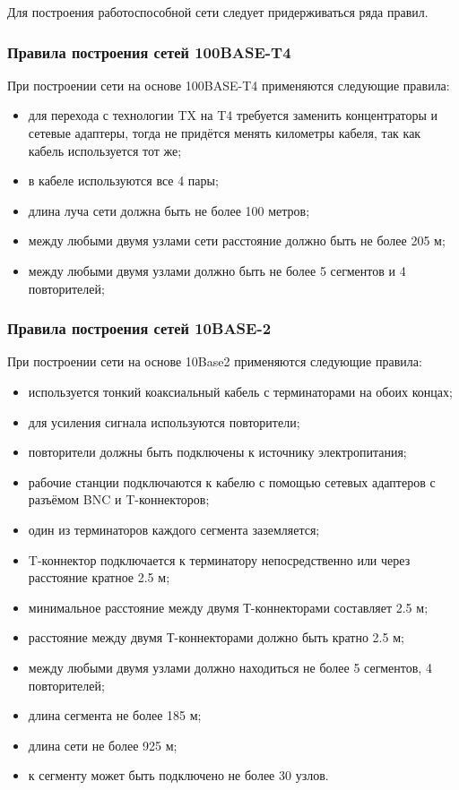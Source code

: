 Для построения работоспособной сети следует придерживаться ряда правил.

\subsubsection{Правила построения сетей 100BASE-T4}

При построении сети на основе 100BASE-T4 применяются следующие правила:
\begin{itemize}
\item для перехода с технологии TX на T4 требуется заменить концентраторы и сетевые адаптеры, тогда не придётся менять километры кабеля, так как кабель используется тот же;
\item в кабеле используются все 4 пары;
\item длина луча сети должна быть не более 100 метров;
\item между любыми двумя узлами сети расстояние должно быть не более 205 м;
\item между любыми двумя узлами должно быть не более 5 сегментов и 4 повторителей;
\end{itemize}

\subsubsection{Правила построения сетей 10BASE-2}

При построении сети на основе 10Base2 применяются следующие правила:
\begin{itemize}
\item используется тонкий коаксиальный кабель с терминаторами на обоих концах;
\item для усиления сигнала используются повторители;
\item повторители должны быть подключены к источнику электропитания;
\item рабочие станции подключаются к кабелю с помощью сетевых адаптеров с разъёмом BNC и T-коннекторов;
\item один из терминаторов каждого сегмента заземляется;
\item T-коннектор подключается к терминатору непосредственно или через расстояние кратное 2.5 м;
\item минимальное расстояние между двумя Т-коннекторами составляет 2.5 м;
\item расстояние между двумя Т-коннекторами должно быть кратно 2.5 м;
\item между любыми двумя узлами должно находиться не более 5 сегментов, 4 повторителей;
\item длина сегмента не более 185 м;
\item длина сети не более 925 м;
\item к сегменту может быть подключено не более 30 узлов.
\end{itemize}

